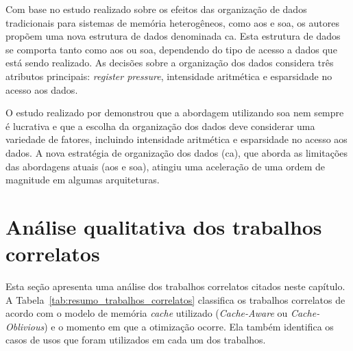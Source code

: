 Com base no estudo realizado sobre os efeitos das organização de dados tradicionais para sistemas de memória heterogêneos, como \ac{aos} e \ac{soa}, os autores propõem uma nova estrutura de dados denominada \ac{ca}.
Esta estrutura de dados se comporta tanto como \ac{aos} ou \ac{soa}, dependendo do tipo de acesso a dados que está sendo realizado.
As decisões sobre a organização dos dados considera três atributos principais: \textit{register pressure}, intensidade aritmética e esparsidade no acesso aos dados.

O estudo realizado por  demonstrou que a abordagem utilizando \ac{soa} nem sempre é lucrativa e que a escolha da organização dos dados deve considerar uma variedade de fatores, incluindo intensidade aritmética e esparsidade no acesso aos dados.
A nova estratégia de organização dos dados (\ac{ca}), que aborda as limitações das abordagens atuais (\ac{aos} e \ac{soa}), atingiu uma aceleração de uma ordem de magnitude em algumas arquiteturas.

\section{Análise qualitativa dos trabalhos correlatos}
\label{sec:analise_trabalhos_correlatos}

Esta seção apresenta uma análise dos trabalhos correlatos citados neste capítulo.
A Tabela~\ref{tab:resumo_trabalhos_correlatos} classifica os trabalhos correlatos de acordo com o modelo de memória \textit{cache} utilizado (\textit{Cache-Aware} ou \textit{Cache-Oblivious}) e o momento em que a otimização ocorre.
Ela também identifica os casos de usos que foram utilizados em cada um dos trabalhos.


